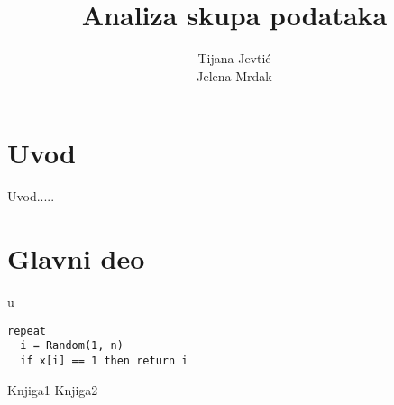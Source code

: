\documentclass[12pt,a4paper]{article}
\title{Analiza skupa podataka }
\author{Tijana Jevti\' c \\ Jelena Mrdak}
\begin{document}
\maketitle

\tableofcontents

\section{Uvod}
Uvod.....

\section{Glavni deo}
u \cite{knjiga1}

\begin{lstlisting}[mathescape=true]
repeat
  i = Random(1, n)
  if x[i] == 1 then return i
\end{lstlisting}


\begin{thebibliography}{9}
  Knjiga1
  Knjiga2
\end{thebibliography}
\end{document}
